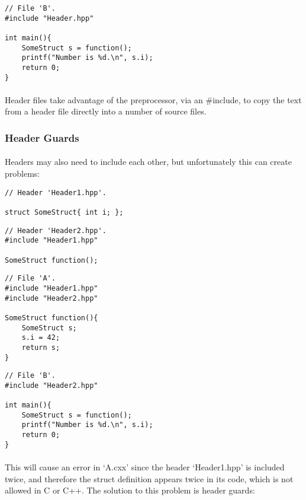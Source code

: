 \documentclass[12pt,twoside,notitlepage]{report}
\begin{document}
\begin{lstlisting}
// File 'B'.
#include "Header.hpp"

int main(){
	SomeStruct s = function();
	printf("Number is %d.\n", s.i);
	return 0;
}
\end{lstlisting}

\paragraph{}
Header files take advantage of the preprocessor, via an \#include, to copy the text from a header file directly into a number of source files.

\subsubsection{Header Guards}

\paragraph{}
Headers may also need to include each other, but unfortunately this can create problems:

\begin{lstlisting}
// Header 'Header1.hpp'.

struct SomeStruct{ int i; };
\end{lstlisting}

\begin{lstlisting}
// Header 'Header2.hpp'.
#include "Header1.hpp"

SomeStruct function();
\end{lstlisting}

\begin{lstlisting}
// File 'A'.
#include "Header1.hpp"
#include "Header2.hpp"

SomeStruct function(){
	SomeStruct s;
	s.i = 42;
	return s;
}
\end{lstlisting}

\begin{lstlisting}
// File 'B'.
#include "Header2.hpp"

int main(){
	SomeStruct s = function();
	printf("Number is %d.\n", s.i);
	return 0;
}
\end{lstlisting}

\paragraph{}
This will cause an error in `A.cxx' since the header `Header1.hpp' is included twice, and therefore the struct definition appears twice in its code, which is not allowed in C or C++. The solution to this problem is header guards:
\end{document}
